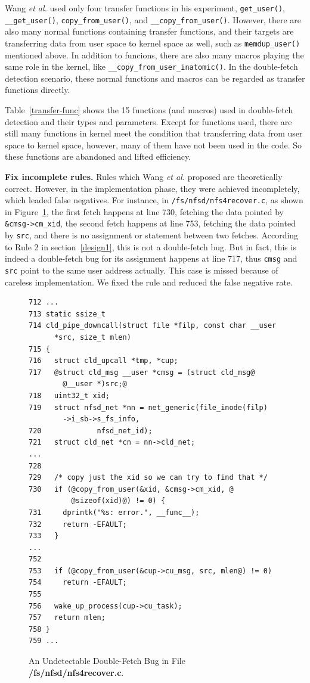 \documentclass[10pt]{llncs}
\begin{document}
Wang \textit{et al.} used only four transfer functions in his experiment, \verb:get_user():, \verb:__get_user():, \verb:copy_from_user():, and \verb:__copy_from_user():. However, there are also many normal functions containing transfer functions, and their targets are transferring data from user space to kernel space as well, such as \verb:memdup_user(): mentioned above. In addition to funcions, there are also many macros playing the same role in the kernel, like \verb:__copy_from_user_inatomic():.
In the double-fetch detection scenario, these normal functions and macros can be regarded as transfer functions directly. 

Table~\ref{transfer-func} shows the 15 functions (and macros) used in double-fetch detection and their types and parameters. Except for functions used, there are still many functions in kernel meet the condition that transferring data from user space to kernel space, however, many of them have not been used in the code. So these functions are abandoned and lifted efficiency.

\textbf{Fix incomplete rules.}
Rules which Wang \textit{et al.} proposed are theoretically correct. However, in the implementation phase, they were achieved incompletely, which leaded false negatives. For instance, in \verb:/fs/nfsd/nfs4recover.c:, as shown in Figure~\ref{fix}, the first fetch happens at line 730, fetching the data pointed by \verb:&cmsg->cm_xid:, the second fetch happens at line 753, fetching the data pointed by \verb:src:, and there is no assignment or statement between two fetches. According to Rule 2 in section~\ref{design1}, this is not a double-fetch bug. But in fact, this is indeed a double-fetch bug for its assignment happens at line 717, thus \verb:cmsg: and \verb:src: point to the same user address actually. This case is missed because of careless implementation. We fixed the rule and reduced the false negative rate.

\begin{figure}[t]
  \centering
\begin{lstlisting}[style=code]
712 ...
713 static ssize_t
714 cld_pipe_downcall(struct file *filp, const char __user 
      *src, size_t mlen)
715 {
716   struct cld_upcall *tmp, *cup;
717   @struct cld_msg __user *cmsg = (struct cld_msg@ 
        @__user *)src;@
718   uint32_t xid;
719   struct nfsd_net *nn = net_generic(file_inode(filp)
        ->i_sb->s_fs_info,
720             nfsd_net_id);
721   struct cld_net *cn = nn->cld_net;
...
728 
729   /* copy just the xid so we can try to find that */
730   if (@copy_from_user(&xid, &cmsg->cm_xid, @
          @sizeof(xid)@) != 0) {
731     dprintk("%s: error.", __func__);
732     return -EFAULT;
733   }
...
752 
753   if (@copy_from_user(&cup->cu_msg, src, mlen@) != 0)
754     return -EFAULT;
755 
756   wake_up_process(cup->cu_task);
757   return mlen;
758 }
759 ...
\end{lstlisting}
  \caption{An Undetectable Double-Fetch Bug in File \textbf{/fs/nfsd/nfs4recover.c}.}
  \label{fix}
\end{figure}
\end{document}

